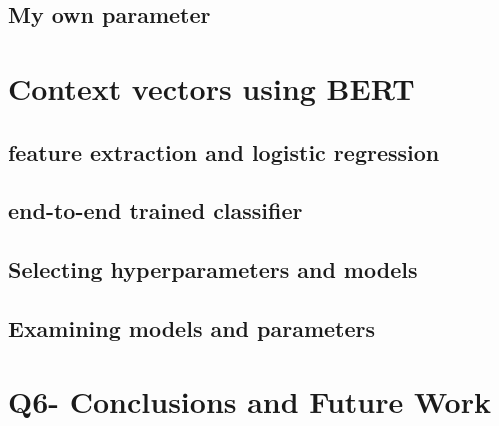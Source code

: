 \documentclass[a4paper,11pt]{article}
\begin{document}
\subsection{My own parameter}


\section{Context vectors using BERT}
\subsection{feature extraction and logistic regression}
\subsection{end-to-end trained classifier}
\subsection{Selecting hyperparameters and models}
\subsection{Examining models and parameters}


\section{Q6- Conclusions and Future Work}
\end{document}
